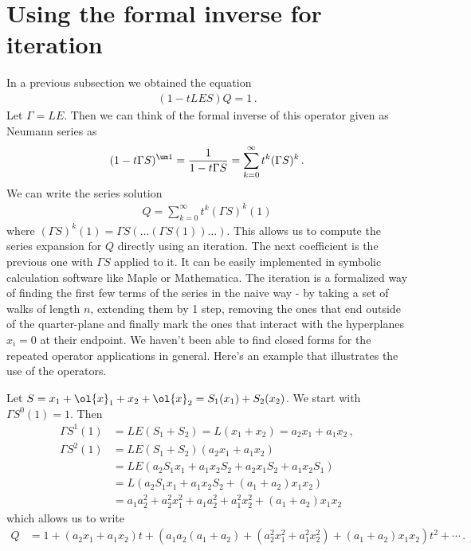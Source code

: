 \section{Using the formal inverse for iteration}
In a previous subsection we obtained the equation
\begin{align}
	(1-tLES)Q = 1\,.
\end{align}
Let $\Gamma = LE$. Then we can think of the formal inverse of this operator given as Neumann series as
\begin{align}
	(1-t\Gamma S)^{\um 1} = \frac{1}{1-t\Gamma S} = \sum_{k=0}^{\infty}t^k(\Gamma S)^k\,.
\end{align}
We can write the series solution
\begin{align}
Q = \sum_{k=0}^{\infty}t^k (\Gamma S)^k(1)
\end{align}
where $(\Gamma S)^k(1) = \Gamma S(\ldots (\Gamma S(1))\ldots)$. This allows us to compute the series expansion for $Q$ directly using an iteration. The next coefficient is the previous one with $\Gamma S$ applied to it. It can be easily implemented in symbolic calculation software like Maple or Mathematica. The iteration is a formalized way of finding the first few terms of the series in the naive way - by taking a set of walks of length $n$, extending them by 1 step, removing the ones that end outside of the quarter-plane and finally mark the ones that interact with the hyperplanes $x_i = 0$ at their endpoint. We haven't been able to find closed forms for the repeated operator applications in general. Here's an example that illustrates the use of the operators.
\begin{example} Let $S = x_1+\ol{x}_1+x_2+\ol{x}_2 = S_1(x_1)+S_2(x_2)$. We start with $\Gamma S^0(1) = 1$. Then
\begin{align*}
	\Gamma S^1(1) &= LE(S_1+S_2) =L(x_1+x_2) = a_2x_1+a_1x_2\,,\\
	\Gamma  S^2(1) &= LE(S_1+S_2)(a_2x_1+a_1x_2) \\
	&= LE(a_2S_1x_1+a_1x_2S_2 + a_2x_1S_2+a_1x_2S_1)\\
	&= L(a_2S_1x_1+a_1x_2S_2+(a_1+a_2)x_1x_2)\\
	&=a_1a_2^2+a_2^2x_1^2+a_1a_2^2+a_1^2x_2^2+(a_1+a_2)x_1x_2
\end{align*}
which allows us to write
\begin{align}
	Q & = 1 + (a_2x_1+a_1x_2)t + \left(a_1a_2(a_1+a_2)+(a_2^2x_1^2+a_1^2x_2^2)+(a_1+a_2)x_1x_2\right)t^2+\cdots\,.
\end{align}
\end{example}

